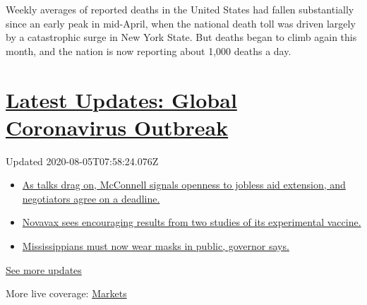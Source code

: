 Weekly averages of reported deaths in the United States had fallen
substantially since an early peak in mid-April, when the national death
toll was driven largely by a catastrophic surge in New York State. But
deaths began to climb again this month, and the nation is now reporting
about 1,000 deaths a day.

\hypertarget{latest-updates-global-coronavirus-outbreak}{%
\section{\texorpdfstring{\href{https://www.nytimes3xbfgragh.onion/2020/08/04/world/coronavirus-cases.html?action=click\&pgtype=Article\&state=default\&region=MAIN_CONTENT_1\&context=storylines_live_updates}{Latest
Updates: Global Coronavirus
Outbreak}}{Latest Updates: Global Coronavirus Outbreak}}\label{latest-updates-global-coronavirus-outbreak}}

Updated 2020-08-05T07:58:24.076Z

\begin{itemize}
\tightlist
\item
  \href{https://www.nytimes3xbfgragh.onion/2020/08/04/world/coronavirus-cases.html?action=click\&pgtype=Article\&state=default\&region=MAIN_CONTENT_1\&context=storylines_live_updates\#link-762df92}{As
  talks drag on, McConnell signals openness to jobless aid extension,
  and negotiators agree on a deadline.}
\item
  \href{https://www.nytimes3xbfgragh.onion/2020/08/04/world/coronavirus-cases.html?action=click\&pgtype=Article\&state=default\&region=MAIN_CONTENT_1\&context=storylines_live_updates\#link-1228a480}{Novavax
  sees encouraging results from two studies of its experimental
  vaccine.}
\item
  \href{https://www.nytimes3xbfgragh.onion/2020/08/04/world/coronavirus-cases.html?action=click\&pgtype=Article\&state=default\&region=MAIN_CONTENT_1\&context=storylines_live_updates\#link-794484ed}{Mississippians
  must now wear masks in public, governor says.}
\end{itemize}

\href{https://www.nytimes3xbfgragh.onion/2020/08/04/world/coronavirus-cases.html?action=click\&pgtype=Article\&state=default\&region=MAIN_CONTENT_1\&context=storylines_live_updates}{See
more updates}

More live coverage:
\href{https://www.nytimes3xbfgragh.onion/live/2020/08/04/business/stock-market-today-coronavirus?action=click\&pgtype=Article\&state=default\&region=MAIN_CONTENT_1\&context=storylines_live_updates}{Markets}

